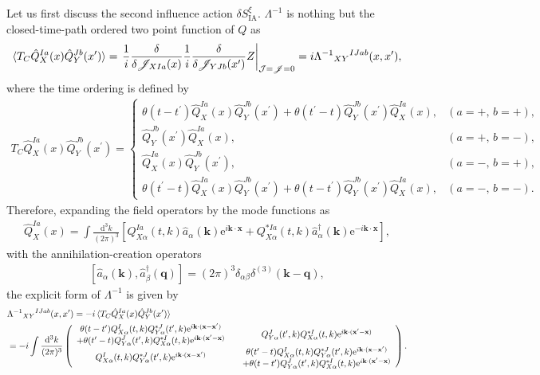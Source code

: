 \documentclass[aps, prd
, preprint
, nofootinbib 
, longbibliography
]{revtex4-1}
\newcommand{\dd}{\mathrm{d}}
\newcommand{\ee}{\mathrm{e}}
\newcommand{\dk}{\frac{\dd^3k}{(2\pi)^3}}
\newcommand{\dps}{\displaystyle}
\newcommand{\IA}{\mathrm{IA}}
\newcommand{\calJ}{\mathcal{J}}
\newcommand{\scrJ}{\mathscr{J}}
\newcommand{\bae}[1]{\begin{align} #1 \end{align}}
\newcommand{\bce}[1]{\begin{cases} #1 \end{cases}}
\newcommand{\bpme}[1]{\begin{pmatrix} #1 \end{pmatrix}}
\begin{document}
Let us first discuss the second influence action $\delta S_\IA^\xi$.
$\Lambda^{-1}$ is nothing but the closed-time-path ordered two point function of $Q$ as
\bae{
	\braket{T_C\hat{Q}_X^{Ia}(x)\hat{Q}_Y^{Jb}(x^\prime)}=\left.\frac{1}{i}\frac{\delta}{\delta\scrJ_{XIa}(x)}\frac{1}{i}\frac{\delta}{\delta\scrJ_{YJb}(x^\prime)}Z\right|_{\calJ=\scrJ=0}=i\Lambda^{-1}{}_{XY}{}^{IJab}(x,x^\prime),
}
where the time ordering is defined by
\bae{
	T_C\hat{Q}_{X}^{Ia}(x)\hat{Q}_Y^{Jb}(x^\prime)=
	\bce{
		\dps
		\theta(t-t^\prime)\hat{Q}_{X}^{Ia}(x)\hat{Q}_Y^{Jb}(x^\prime)+\theta(t^\prime-t)\hat{Q}_Y^{Jb}(x^\prime)\hat{Q}_X^{Ia}(x), & (a=+,\,b=+), \\
		\dps
		\hat{Q}_Y^{Jb}(x^\prime)\hat{Q}_X^{Ia}(x), & (a=+,\,b=-), \\
		\dps
		\hat{Q}_X^{Ia}(x)\hat{Q}_Y^{Jb}(x^\prime), & (a=-,\,b=+), \\
		\dps
		\theta(t^\prime-t)\hat{Q}_{X}^{Ia}(x)\hat{Q}_Y^{Jb}(x^\prime)+\theta(t-t^\prime)\hat{Q}_Y^{Jb}(x^\prime)\hat{Q}_X^{Ia}(x), & (a=-,\,b=-).
	}
}
Therefore, expanding the field operators by the mode functions as
\bae{\label{eq: mode expansion}
	\hat{Q}_X^{Ia}(x)=\int\dk\left[Q_{X\alpha}^{Ia}(t,k)\hat{a}_\alpha(\mathbf{k})\ee^{i\mathbf{k}\cdot\mathbf{x}}
	+Q_{X\alpha}^{*Ia}(t,k)\hat{a}^\dagger_\alpha(\mathbf{k})\ee^{-i\mathbf{k}\cdot\mathbf{x}}\right],
}
with the annihilation-creation operators
\bae{\label{eq: aadagger}
	[\hat{a}_\alpha(\mathbf{k}),\hat{a}^\dagger_\beta(\mathbf{q})]=(2\pi)^3\delta_{\alpha\beta}\delta^{(3)}(\mathbf{k}-\mathbf{q}),
}
the explicit form of $\Lambda^{-1}$ is given by
\bae{
	&\Lambda^{-1}{}_{XY}{}^{IJab}(x,x^\prime)=-i\braket{T_C\hat{Q}_X^{Ia}(x)\hat{Q}_Y^{Jb}(x^\prime)} \nonumber \\
	&=-i\int\dk\bpme{
		\begin{array}{c}
			\theta(t-t^\prime)Q_{X\alpha}^I(t,k)Q^{*J}_{Y\alpha}(t^\prime,k)\ee^{i\mathbf{k}\cdot(\mathbf{x}-\mathbf{x}^\prime)} \\
			+\theta(t^\prime-t)Q_{Y\alpha}^J(t^\prime,k)Q_{X\alpha}^{*I}(t,k)\ee^{i\mathbf{k}\cdot(\mathbf{x}^\prime-\mathbf{x})}
		\end{array}
		& Q^J_{Y\alpha}(t^\prime,k)Q_{X\alpha}^{*I}(t,k)\ee^{i\mathbf{k}\cdot(\mathbf{x}^\prime-\mathbf{x})} \\
		Q_{X\alpha}^I(t,k)Q^{*J}_{Y\alpha}(t^\prime,k)\ee^{i\mathbf{k}\cdot(\mathbf{x}-\mathbf{x}^\prime)} &
		\begin{array}{c}
			\theta(t^\prime-t)Q_{X\alpha}^I(t,k)Q^{*J}_{Y\alpha}(t^\prime,k)\ee^{i\mathbf{k}\cdot(\mathbf{x}-\mathbf{x}^\prime)} \\
			+\theta(t-t^\prime)Q^J_{Y\alpha}(t^\prime,k)Q_{X\alpha}^{*I}(t,k)\ee^{i\mathbf{k}\cdot(\mathbf{x}^\prime-\mathbf{x})}
		\end{array}
	}.
}
\end{document}
